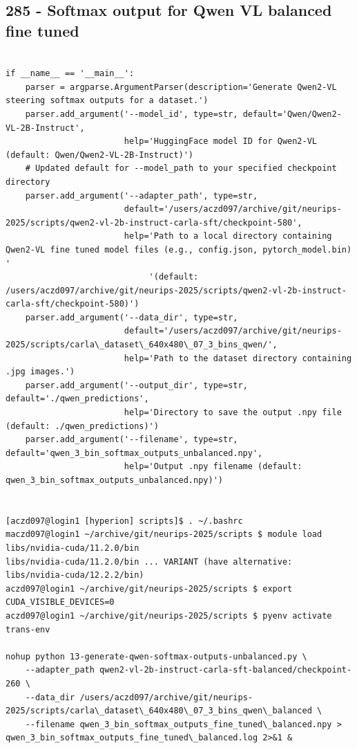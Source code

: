 \subsection{285 - Softmax output for Qwen VL balanced fine tuned}
\label{app_res:285}

\begin{verbatim}

if __name__ == '__main__':
    parser = argparse.ArgumentParser(description='Generate Qwen2-VL steering softmax outputs for a dataset.')
    parser.add_argument('--model_id', type=str, default='Qwen/Qwen2-VL-2B-Instruct',
                        help='HuggingFace model ID for Qwen2-VL (default: Qwen/Qwen2-VL-2B-Instruct)')
    # Updated default for --model_path to your specified checkpoint directory
    parser.add_argument('--adapter_path', type=str,
                        default='/users/aczd097/archive/git/neurips-2025/scripts/qwen2-vl-2b-instruct-carla-sft/checkpoint-580',
                        help='Path to a local directory containing Qwen2-VL fine tuned model files (e.g., config.json, pytorch_model.bin) '
                             '(default: /users/aczd097/archive/git/neurips-2025/scripts/qwen2-vl-2b-instruct-carla-sft/checkpoint-580)')
    parser.add_argument('--data_dir', type=str,
                        default='/users/aczd097/archive/git/neurips-2025/scripts/carla\_dataset\_640x480\_07_3_bins_qwen/',
                        help='Path to the dataset directory containing .jpg images.')
    parser.add_argument('--output_dir', type=str, default='./qwen_predictions',
                        help='Directory to save the output .npy file (default: ./qwen_predictions)')
    parser.add_argument('--filename', type=str, default='qwen_3_bin_softmax_outputs_unbalanced.npy',
                        help='Output .npy filename (default: qwen_3_bin_softmax_outputs_unbalanced.npy)')


[aczd097@login1 [hyperion] scripts]$ . ~/.bashrc 
maczd097@login1 ~/archive/git/neurips-2025/scripts $ module load libs/nvidia-cuda/11.2.0/bin 
libs/nvidia-cuda/11.2.0/bin ... VARIANT (have alternative: libs/nvidia-cuda/12.2.2/bin)
aczd097@login1 ~/archive/git/neurips-2025/scripts $ export CUDA_VISIBLE_DEVICES=0
aczd097@login1 ~/archive/git/neurips-2025/scripts $ pyenv activate trans-env

nohup python 13-generate-qwen-softmax-outputs-unbalanced.py \
    --adapter_path qwen2-vl-2b-instruct-carla-sft-balanced/checkpoint-260 \
    --data_dir /users/aczd097/archive/git/neurips-2025/scripts/carla\_dataset\_640x480\_07_3_bins_qwen\_balanced \
    --filename qwen_3_bin_softmax_outputs_fine_tuned\_balanced.npy > qwen_3_bin_softmax_outputs_fine_tuned\_balanced.log 2>&1 &
    

\end{verbatim}
